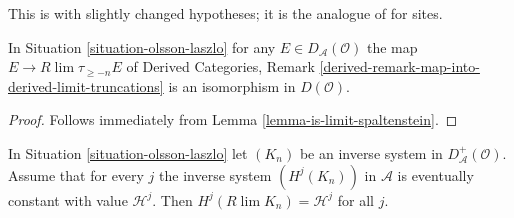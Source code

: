 \begin{lemma}
\label{lemma-olsson-laszlo}
\begin{reference}
This is \cite[Proposition 2.1.4]{six-I} with slightly changed
hypotheses; it is the analogue of \cite[Proposition 3.13]{Spaltenstein}
for sites.
\end{reference}
In Situation \ref{situation-olsson-laszlo} for any
$E \in D_\mathcal{A}(\mathcal{O})$ the map
$E \to R\lim \tau_{\geq -n} E$ of
Derived Categories, Remark
\ref{derived-remark-map-into-derived-limit-truncations}
is an isomorphism in $D(\mathcal{O})$.
\end{lemma}

\begin{proof}
Follows immediately from Lemma \ref{lemma-is-limit-spaltenstein}.
\end{proof}

\begin{lemma}
\label{lemma-olsson-laszlo-modified}
In Situation \ref{situation-olsson-laszlo} let
$(K_n)$ be an inverse system in $D_\mathcal{A}^+(\mathcal{O})$.
Assume that for every $j$ the inverse system $(H^j(K_n))$
in $\mathcal{A}$ is eventually constant with value $\mathcal{H}^j$. Then
$H^j(R\lim K_n) = \mathcal{H}^j$ for all $j$.
\end{lemma}

